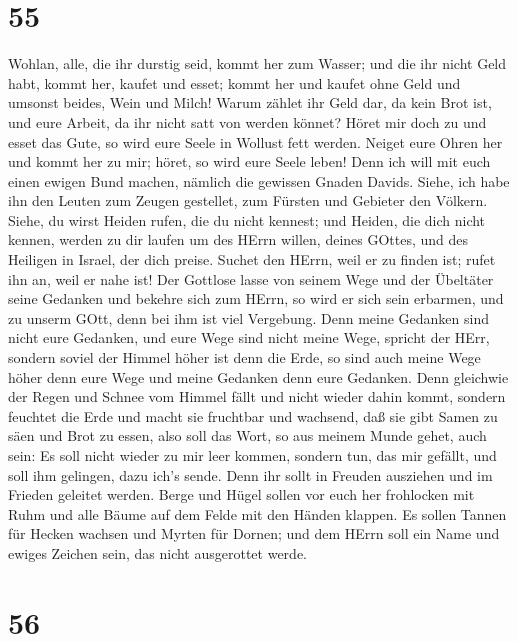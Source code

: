 \hypertarget{section-54}{%
\section{55}\label{section-54}}

 Wohlan, alle, die ihr durstig seid, kommt her zum Wasser;
und die ihr nicht Geld habt, kommt her, kaufet und esset; kommt her und
kaufet ohne Geld und umsonst beides, Wein und Milch!  Warum
zählet ihr Geld dar, da kein Brot ist, und eure Arbeit, da ihr nicht
satt von werden könnet? Höret mir doch zu und esset das Gute, so wird
eure Seele in Wollust fett werden.  Neiget eure Ohren her
und kommt her zu mir; höret, so wird eure Seele leben! Denn ich will mit
euch einen ewigen Bund machen, nämlich die gewissen Gnaden Davids.
 Siehe, ich habe ihn den Leuten zum Zeugen gestellet, zum
Fürsten und Gebieter den Völkern.  Siehe, du wirst Heiden
rufen, die du nicht kennest; und Heiden, die dich nicht kennen, werden
zu dir laufen um des HErrn willen, deines GOttes, und des Heiligen in
Israel, der dich preise.  Suchet den HErrn, weil er zu
finden ist; rufet ihn an, weil er nahe ist!  Der Gottlose
lasse von seinem Wege und der Übeltäter seine Gedanken und bekehre sich
zum HErrn, so wird er sich sein erbarmen, und zu unserm GOtt, denn bei
ihm ist viel Vergebung.  Denn meine Gedanken sind nicht eure
Gedanken, und eure Wege sind nicht meine Wege, spricht der HErr,
 sondern soviel der Himmel höher ist denn die Erde, so sind
auch meine Wege höher denn eure Wege und meine Gedanken denn eure
Gedanken.  Denn gleichwie der Regen und Schnee vom Himmel
fällt und nicht wieder dahin kommt, sondern feuchtet die Erde und macht
sie fruchtbar und wachsend, daß sie gibt Samen zu säen und Brot zu
essen,  also soll das Wort, so aus meinem Munde gehet, auch
sein: Es soll nicht wieder zu mir leer kommen, sondern tun, das mir
gefällt, und soll ihm gelingen, dazu ich's sende.  Denn ihr
sollt in Freuden ausziehen und im Frieden geleitet werden. Berge und
Hügel sollen vor euch her frohlocken mit Ruhm und alle Bäume auf dem
Felde mit den Händen klappen.  Es sollen Tannen für Hecken
wachsen und Myrten für Dornen; und dem HErrn soll ein Name und ewiges
Zeichen sein, das nicht ausgerottet werde.

\hypertarget{section-55}{%
\section{56}\label{section-55}}

